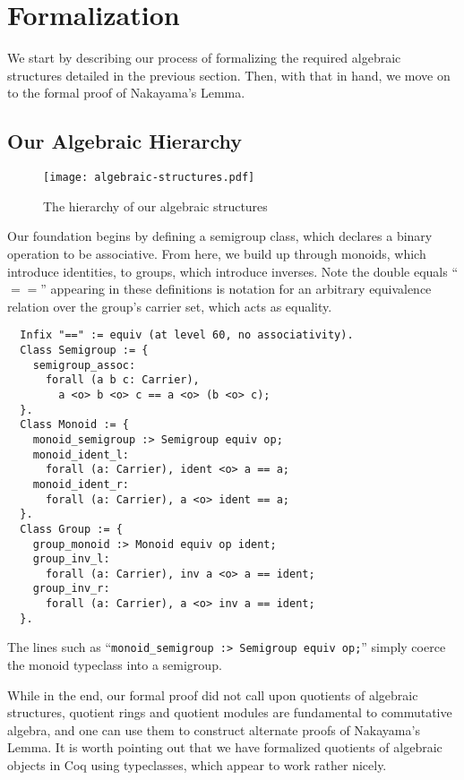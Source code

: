 \documentclass{article}
\begin{document}
\section{Formalization}

We start by describing our process of formalizing the required algebraic structures detailed in the previous section.  Then, with that in hand, we move on to the formal proof of Nakayama's Lemma.  

\subsection{Our Algebraic Hierarchy}

\begin{figure}[t]
\caption{The hierarchy of our algebraic structures}
\texttt{[image: algebraic-structures.pdf]}
\centering
{}
\end{figure}

Our foundation begins by defining a semigroup class, which declares a binary operation to
be associative. 
From here, we build up through monoids, which introduce
identities, to groups, which introduce inverses.  
Note the double equals ``$==$'' appearing in
these definitions is notation for an arbitrary equivalence relation over the
group's carrier set, which acts as equality.

\begin{verbatim}
  Infix "==" := equiv (at level 60, no associativity).
  Class Semigroup := {
    semigroup_assoc:
      forall (a b c: Carrier),
        a <o> b <o> c == a <o> (b <o> c);
  }.
  Class Monoid := {
    monoid_semigroup :> Semigroup equiv op;
    monoid_ident_l:
      forall (a: Carrier), ident <o> a == a;
    monoid_ident_r:
      forall (a: Carrier), a <o> ident == a;
  }.
  Class Group := {
    group_monoid :> Monoid equiv op ident;
    group_inv_l:
      forall (a: Carrier), inv a <o> a == ident;
    group_inv_r:
      forall (a: Carrier), a <o> inv a == ident;
  }.
\end{verbatim}
The lines such as  ``\verb|monoid_semigroup :> Semigroup equiv op;|'' simply coerce
the monoid typeclass into a semigroup.

While in the end, our formal proof did not call upon quotients of algebraic structures, quotient rings and quotient modules are fundamental to commutative algebra, and one can use them to construct alternate proofs of Nakayama's Lemma.
It is worth pointing out that we have formalized quotients of algebraic objects  in Coq using typeclasses, which appear to work rather nicely. 
\end{document}
